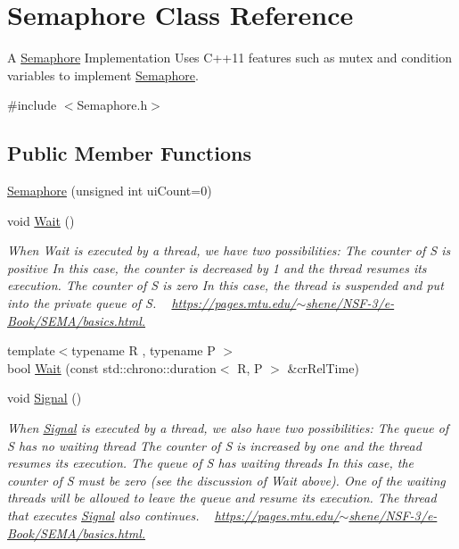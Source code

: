 \hypertarget{class_semaphore}{}\section{Semaphore Class Reference}
\label{class_semaphore}


A \hyperlink{class_semaphore}{Semaphore} Implementation Uses C++11 features such as mutex and condition variables to implement \hyperlink{class_semaphore}{Semaphore}.  




{\ttfamily \#include $<$Semaphore.\+h$>$}

\subsection*{Public Member Functions}
\begin{DoxyCompactItemize}
\item 
\hyperlink{class_semaphore_a0d9290d316636875ca85d1d78950a817}{Semaphore} (unsigned int ui\+Count=0)
\item 
void \hyperlink{class_semaphore_a72aabebf026e3a8b1f3e4d0fa8ee1eda}{Wait} ()
\begin{DoxyCompactList}\small\item\em When Wait is executed by a thread, we have two possibilities\+: The counter of S is positive In this case, the counter is decreased by 1 and the thread resumes its execution. The counter of S is zero In this case, the thread is suspended and put into the private queue of S. ~\newline
\hyperlink{}{https\+://pages.\+mtu.\+edu/$\sim$shene/\+N\+S\+F-\/3/e-\/\+Book/\+S\+E\+M\+A/basics.\+html.}\end{DoxyCompactList}\item 
{\footnotesize template$<$typename R , typename P $>$ }\\bool \hyperlink{class_semaphore_a7f700173ae86ae623684109066e07656}{Wait} (const std\+::chrono\+::duration$<$ R, P $>$ \&cr\+Rel\+Time)
\item 
void \hyperlink{class_semaphore_a86f92f738b4486439b296d8e235895f2}{Signal} ()
\begin{DoxyCompactList}\small\item\em When \hyperlink{class_signal}{Signal} is executed by a thread, we also have two possibilities\+: The queue of S has no waiting thread The counter of S is increased by one and the thread resumes its execution. The queue of S has waiting threads In this case, the counter of S must be zero (see the discussion of Wait above). One of the waiting threads will be allowed to leave the queue and resume its execution. The thread that executes \hyperlink{class_signal}{Signal} also continues. ~\newline
\hyperlink{}{https\+://pages.\+mtu.\+edu/$\sim$shene/\+N\+S\+F-\/3/e-\/\+Book/\+S\+E\+M\+A/basics.\+html.}\end{DoxyCompactList}\end{DoxyCompactItemize}


